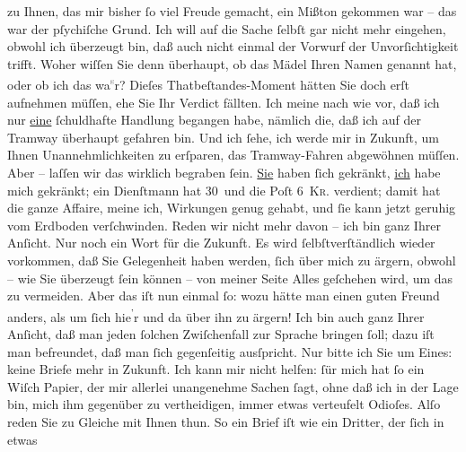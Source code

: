 \begin{ledgroupsized}[t]{13cm}
               zu Ihnen, das mir bisher ſo viel Freude gemacht, ein Mißton gekommen war – das war
               der pſychiſche Grund. Ich will auf die Sache ſelbſt gar nicht mehr eingehen, obwohl
               ich überzeugt bin, daß auch nicht einmal der Vorwurf der Unvorſich{\pb}tigkeit trifft. Woher wiſſen Sie denn überhaupt, ob
               das Mädel Ihren Namen
               genannt hat, oder ob ich das wa\substVorne{}\textsuperscript{\textcolor{gray}{s}}\substDazwischen{}r\substHinten{}? Dieſes Thatbeſtandes-Moment hätten Sie doch erſt aufnehmen müſſen, ehe Sie
               Ihr Verdict fällten. Ich meine nach wie vor, daß ich nur \uline{eine} ſchuldhafte Handlung begangen habe, nämlich die, daß ich auf der
               Tramway überhaupt gefahren bin. Und ich ſehe, ich werde mir in Zukunft, um Ihnen
               Unannehmlichkeiten zu erſparen, das Tramway-Fahren abgewöhnen müſſen.\pend
           \pstart
           Aber – laſſen wir das wirklich begraben ſein. \uline{Sie}
               haben ſich gekränkt, \uline{ich} habe mich gekränkt; ein
               Dienſtmann hat 30 und die Poſt 6 \textsc{Kr.} verdient; damit hat
               die ganze Affaire, meine ich, Wirkungen genug gehabt, und ſie kann jetzt geruhig vom
               Erdboden verſchwinden. Reden wir nicht mehr davon – ich bin ganz Ihrer Anſicht.\pend
           \pstart
           Nur noch ein Wort für die Zukunft. Es wird ſelbſtverſtändlich wieder vorkommen, daß
               Sie Gelegenheit haben werden, ſich über mich zu ärgern, obwohl – wie Sie überzeugt
               ſein können – von meiner Seite Alles geſchehen wird, um das zu {\pb}vermeiden. Aber das iſt nun einmal ſo: wozu hätte
               man einen guten Freund anders, als um ſich hie\substVorne{}\textsuperscript{’}\substDazwischen{}r\substHinten{} und da über ihn zu ärgern! Ich bin auch ganz Ihrer Anſicht, daß man jeden
               ſolchen Zwiſchenfall zur Sprache bringen ſoll; dazu iſt man befreundet, daß man ſich
               gegenſeitig ausſpricht. Nur bitte ich Sie um Eines: keine Briefe mehr in Zukunft. Ich
               kann mir nicht \strikeout{\textcolor{gray}{hef}} helfen: ſür mich hat ſo ein Wiſch Papier, der mir  allerlei unangenehme Sachen ſagt, ohne daß ich in der Lage bin, mich ihm
               gegenüber zu vertheidigen, immer etwas verteufelt Odioſes. Alſo reden Sie zu\strikeout{\textcolor{gray}{r}} Gleiche mit Ihnen thun. So ein Brief iſt wie ein Dritter, der ſich in etwas

\end{ledgroupsized}

